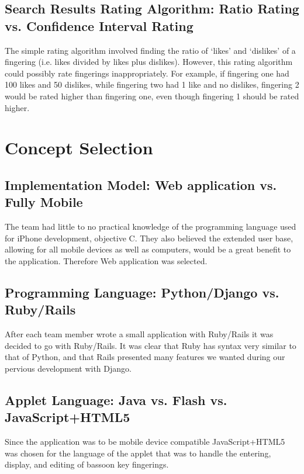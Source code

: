 \documentclass[12pt,english]{article}
\begin{document}
\subsection{Search Results Rating Algorithm: Ratio Rating vs. Confidence Interval
Rating}

The simple rating algorithm involved finding the ratio of `likes'
and `dislikes' of a fingering (i.e. likes divided by likes plus dislikes).
However, this rating algorithm could possibly rate fingerings inappropriately.
For example, if fingering one had 100 likes and 50 dislikes, while
fingering two had 1 like and no dislikes, fingering 2 would be rated
higher than fingering one, even though fingering 1 should be rated
higher.


\section{Concept Selection}


\subsection{Implementation Model: Web application vs. Fully Mobile}

The team had little to no practical knowledge of the programming language
used for iPhone development, objective C.  They also believed the extended
user base, allowing for all mobile devices as well as computers, would
be a great benefit to the application. Therefore Web application was selected.


\subsection{Programming Language: Python/Django vs. Ruby/Rails}

After each team member wrote a small application with Ruby/Rails
it was decided to go with Ruby/Rails.  It was clear that Ruby has
syntax very similar to that of Python, and that Rails presented 
many features we wanted during our pervious development with
Django.


\subsection{Applet Language: Java vs. Flash vs. JavaScript+HTML5}

Since the application was to be mobile device compatible JavaScript+HTML5
was chosen for the language of the applet that was to handle the entering,
display, and editing of bassoon key fingerings.
\end{document}
